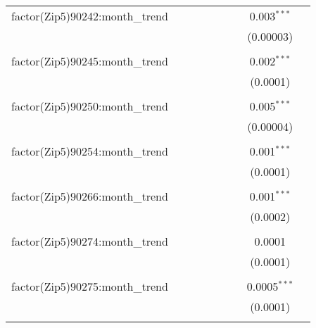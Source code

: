\begin{table}[H]
{\begin{tabular}{@{\extracolsep{5pt}}lcccccccc}
  factor(Zip5)90242:month\_trend &  &  &  &  &  &  & 0.003$^{***}$ &  \\  

   &  &  &  &  &  &  & (0.00003) &  \\  

   & & & & & & & & \\  

  factor(Zip5)90245:month\_trend &  &  &  &  &  &  & 0.002$^{***}$ &  \\  

   &  &  &  &  &  &  & (0.0001) &  \\  

   & & & & & & & & \\  

  factor(Zip5)90250:month\_trend &  &  &  &  &  &  & 0.005$^{***}$ &  \\  

   &  &  &  &  &  &  & (0.00004) &  \\  

   & & & & & & & & \\  

  factor(Zip5)90254:month\_trend &  &  &  &  &  &  & 0.001$^{***}$ &  \\  

   &  &  &  &  &  &  & (0.0001) &  \\  

   & & & & & & & & \\  

  factor(Zip5)90266:month\_trend &  &  &  &  &  &  & 0.001$^{***}$ &  \\  

   &  &  &  &  &  &  & (0.0002) &  \\  

   & & & & & & & & \\  

  factor(Zip5)90274:month\_trend &  &  &  &  &  &  & 0.0001 &  \\  

   &  &  &  &  &  &  & (0.0001) &  \\  

   & & & & & & & & \\  

  factor(Zip5)90275:month\_trend &  &  &  &  &  &  & 0.0005$^{***}$ &  \\  

   &  &  &  &  &  &  & (0.0001) &  \\  

   & & & & & & & & \\  


\end{tabular}}
\end{table}
